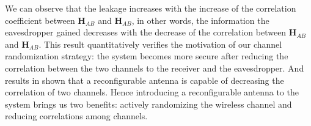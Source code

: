 We can observe that the leakage increases with the increase of the correlation coefficient between $\mathbf{H}_{AB}$ and $\mathbf{H}_{AB}$, in other words, the information the eavesdropper gained decreases with the decrease of the correlation between $\mathbf{H}_{AB}$ and $\mathbf{H}_{AB}$. This result quantitatively verifies the motivation of our channel randomization strategy: the system becomes more secure after reducing the correlation between the two channels to the receiver and the eavesdropper. And results in \cite{pan2017message} shown that a reconfigurable antenna is capable of decreasing the correlation of two channels. Hence introducing a reconfigurable antenna to the system brings us two benefits: actively randomizing the wireless channel and reducing correlations among channels. 

